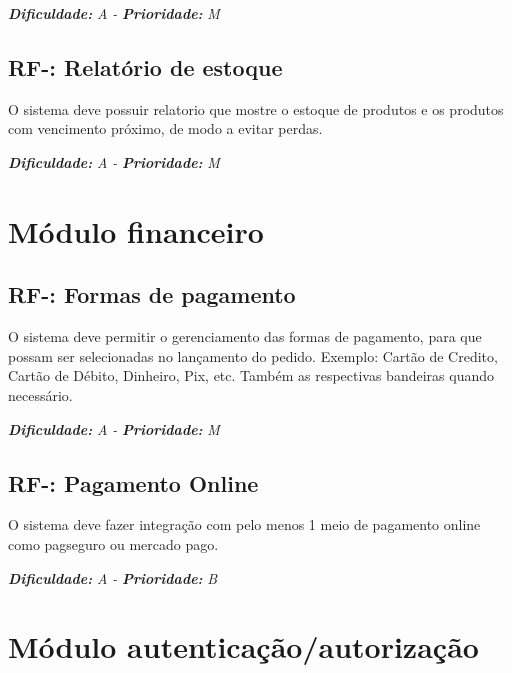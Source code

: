 \vspace{0.5cm}
\noindent\textbf{\textit{Dificuldade:}} \textit{A -} \textbf{\textit{Prioridade:}} \textit{M}
\vspace{0.5cm}
\pgfmathtruncatemacro{}
\subsection{RF-\nreq: Relatório de estoque}
O sistema deve possuir relatorio que mostre o estoque de produtos e os produtos com vencimento próximo, de modo a 
evitar perdas.

\vspace{0.5cm}
\noindent\textbf{\textit{Dificuldade:}} \textit{A -} \textbf{\textit{Prioridade:}} \textit{M}
\vspace{0.5cm}

\section{Módulo financeiro}
\vspace{0.5cm}
\pgfmathtruncatemacro{}
\subsection{RF-\nreq: Formas de pagamento}
O sistema deve permitir o gerenciamento das formas de pagamento, para que possam ser selecionadas no lançamento do
pedido. Exemplo: Cartão de Credito, Cartão de Débito, Dinheiro, Pix, etc. Também as respectivas bandeiras quando 
necessário.

\vspace{0.5cm}
\noindent\textbf{\textit{Dificuldade:}} \textit{A -} \textbf{\textit{Prioridade:}} \textit{M}
\vspace{0.5cm}
\pgfmathtruncatemacro{}
\subsection{RF-\nreq: Pagamento Online}
O sistema deve fazer integração com pelo menos 1 meio de pagamento online como pagseguro ou mercado pago.

\vspace{0.5cm}
\noindent\textbf{\textit{Dificuldade:}} \textit{A -} \textbf{\textit{Prioridade:}} \textit{B}
\vspace{0.5cm}

\section{Módulo autenticação/autorização}
\vspace{0.5cm}
\pgfmathtruncatemacro{}
